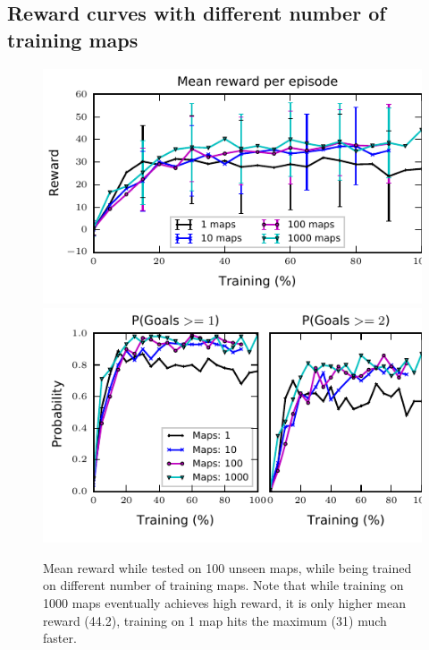 \subsection{Reward curves with different number of training maps}
\begin{figure}%
\includegraphics[width=0.5\columnwidth]{images/plot_reward_3D-1000.pdf}%
\includegraphics[width=0.5\columnwidth]{images/plot_probability_3D-1000.pdf}%
\vspace{-1em}%
\caption{Mean reward while tested on 100 unseen maps, while being trained on different number of training maps. Note that while training on 1000 maps eventually achieves high reward, it is only higher mean reward (44.2), training on 1 map hits the maximum (31) much faster.}%
\label{fig:plot_reward_on_testing}%
\end{figure}

